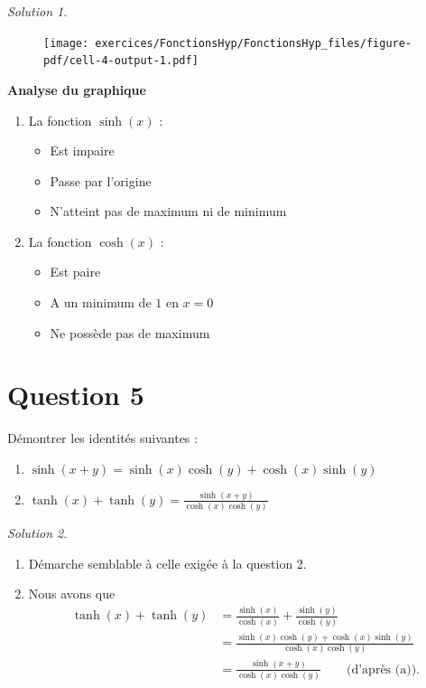 \documentclass[
  12pt,
  letterpaper,
]{book}
\providecommand{\tightlist}{%
  \setlength{\itemsep}{0pt}\setlength{\parskip}{0pt}}\usepackage{longtable,booktabs,array}
\theoremstyle{remark}
\newtheorem*{solution}{Solution}
\begin{document}
\begin{solution}
\begin{figure}[H]
{\centering \texttt{[image: exercices/FonctionsHyp/FonctionsHyp\_files/figure-pdf/cell-4-output-1.pdf]}

}

\end{figure}

\textbf{Analyse du graphique}

\begin{enumerate}
\def\labelenumi{\arabic{enumi}.}
\tightlist
\item
  La fonction \(\sinh(x)\) :

  \begin{itemize}
  \tightlist
  \item
    Est impaire
  \item
    Passe par l'origine
  \item
    N'atteint pas de maximum ni de minimum
  \end{itemize}
\item
  La fonction \(\cosh(x)\) :

  \begin{itemize}
  \tightlist
  \item
    Est paire
  \item
    A un minimum de \(1\) en \(x = 0\)
  \item
    Ne possède pas de maximum
  \end{itemize}
\end{enumerate}

\end{solution}

\hypertarget{question-5-3}{%
\section{Question 5}\label{question-5-3}}

Démontrer les identités suivantes :

\begin{enumerate}
\def\labelenumi{\arabic{enumi}.}
\item
  \(\sinh(x+y) = \sinh(x)\cosh(y) + \cosh(x)\sinh(y)\)
\item
  \(\tanh(x) + \tanh(y) = \frac{\sinh(x+y)}{\cosh(x)\cosh(y)}\)
\end{enumerate}

\begin{solution}

\begin{enumerate}
\def\labelenumi{\arabic{enumi}.}
\item
  Démarche semblable à celle exigée à la question 2.
\item
  Nous avons que \begin{align}
  \tanh(x) + \tanh(y) &= \frac{\sinh(x)}{\cosh(x)} + \frac{\sinh(y)}{\cosh(y)}\\
  &= \frac{\sinh(x)\cosh(y) + \cosh(x)\sinh(y)}{\cosh(x)\cosh(y)}\\
  &= \frac{\sinh(x+y)}{\cosh(x)\cosh(y)}\qquad\text{(d'après (a)).}
  \end{align}
\end{enumerate}

\end{solution}
\end{document}
